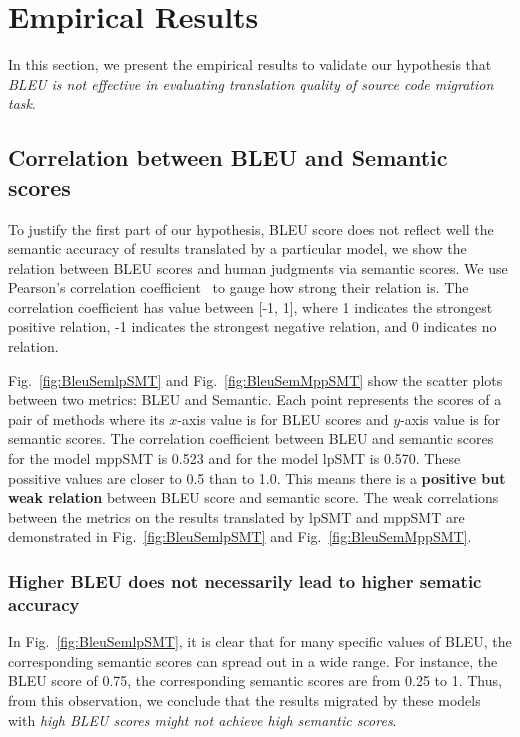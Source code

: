 \section{Empirical Results}
\label{sec:bleuresult}

In this section, we present the empirical results to validate our hypothesis that 
\textit{BLEU is not effective in evaluating translation quality of source code migration task}.
\subsection{Correlation between BLEU and Semantic scores}
To justify the first part of our hypothesis, BLEU score does not reflect well 
the semantic accuracy of results translated by a particular model, 
we show the relation between BLEU scores and human judgments via semantic scores. 
We use Pearson's correlation coefficient~\cite{PearsonCorrelation} to gauge
how strong their relation is. The correlation coefficient has value
between [-1, 1], where 1 indicates the strongest positive relation, -1
indicates the strongest negative relation, and 0 indicates no relation.

Fig.~\ref{fig:BleuSemlpSMT} and Fig.~\ref{fig:BleuSemMppSMT} show the
scatter plots between two metrics: BLEU and Semantic. Each point
represents the scores of a pair of methods where its $x$-axis value is
for BLEU scores and $y$-axis value is for semantic scores. The
correlation coefficient between BLEU and semantic scores for the model
mppSMT is 0.523 and for the model lpSMT is 0.570. These possitive values 
are closer to 0.5 than to 1.0. This means there is a {\bf positive but weak 
relation} between BLEU score and semantic score. The weak correlations %
between the metrics on the results translated by lpSMT and mppSMT are 
demonstrated in Fig.~\ref{fig:BleuSemlpSMT} and Fig.~\ref{fig:BleuSemMppSMT}.


\subsubsection{{\bf Higher BLEU does not necessarily lead to higher
sematic accuracy}}

In Fig.~\ref{fig:BleuSemlpSMT}, it is clear that for many specific
values of BLEU, the corresponding semantic scores can spread out in a
wide range. For instance, the BLEU score of 0.75, the corresponding
semantic scores are from 0.25 to 1.
Thus, from this observation, we conclude that the results migrated by
these models with {\em high BLEU scores might not achieve high semantic
scores}.
%

